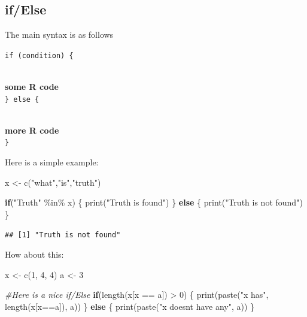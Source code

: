\documentclass[
]{book}
\newenvironment{Shaded}{\begin{snugshade}}{\end{snugshade}}
\newcommand{\CommentTok}[1]{\textcolor[rgb]{0.56,0.35,0.01}{\textit{#1}}}
\newcommand{\ControlFlowTok}[1]{\textcolor[rgb]{0.13,0.29,0.53}{\textbf{#1}}}
\newcommand{\DecValTok}[1]{\textcolor[rgb]{0.00,0.00,0.81}{#1}}
\newcommand{\FunctionTok}[1]{\textcolor[rgb]{0.00,0.00,0.00}{#1}}
\newcommand{\NormalTok}[1]{#1}
\newcommand{\OtherTok}[1]{\textcolor[rgb]{0.56,0.35,0.01}{#1}}
\newcommand{\SpecialCharTok}[1]{\textcolor[rgb]{0.00,0.00,0.00}{#1}}
\newcommand{\StringTok}[1]{\textcolor[rgb]{0.31,0.60,0.02}{#1}}
\theoremstyle{definition}
\theoremstyle{definition}
\theoremstyle{definition}
\theoremstyle{definition}
\theoremstyle{remark}
\begin{document}
\hypertarget{ifelse}{%
\subsection{if/Else}\label{ifelse}}

The main syntax is as follows

\texttt{if\ (condition)\ \{}\strut \\
\textbf{some R code}\\
\texttt{\}\ else\ \{}\strut \\
\textbf{more R code}\\
\texttt{\}}

Here is a simple example:

\begin{Shaded}
\begin{Highlighting}[]
\NormalTok{x }\OtherTok{\textless{}{-}} \FunctionTok{c}\NormalTok{(}\StringTok{"what"}\NormalTok{,}\StringTok{"is"}\NormalTok{,}\StringTok{"truth"}\NormalTok{)}

\ControlFlowTok{if}\NormalTok{(}\StringTok{"Truth"} \SpecialCharTok{\%in\%}\NormalTok{ x) \{}
   \FunctionTok{print}\NormalTok{(}\StringTok{"Truth is found"}\NormalTok{)}
\NormalTok{\} }\ControlFlowTok{else}\NormalTok{ \{}
   \FunctionTok{print}\NormalTok{(}\StringTok{"Truth is not found"}\NormalTok{)}
\NormalTok{\}}
\end{Highlighting}
\end{Shaded}

\begin{verbatim}
## [1] "Truth is not found"
\end{verbatim}

How about this:

\begin{Shaded}
\begin{Highlighting}[]
\NormalTok{x }\OtherTok{\textless{}{-}} \FunctionTok{c}\NormalTok{(}\DecValTok{1}\NormalTok{, }\DecValTok{4}\NormalTok{, }\DecValTok{4}\NormalTok{)}
\NormalTok{a }\OtherTok{\textless{}{-}} \DecValTok{3}

\CommentTok{\#Here is a nice if/Else}
\ControlFlowTok{if}\NormalTok{(}\FunctionTok{length}\NormalTok{(x[x }\SpecialCharTok{==}\NormalTok{ a]) }\SpecialCharTok{\textgreater{}} \DecValTok{0}\NormalTok{) \{}
  \FunctionTok{print}\NormalTok{(}\FunctionTok{paste}\NormalTok{(}\StringTok{"x has"}\NormalTok{, }\FunctionTok{length}\NormalTok{(x[x}\SpecialCharTok{==}\NormalTok{a]), a))}
\NormalTok{\} }\ControlFlowTok{else}\NormalTok{ \{}
  \FunctionTok{print}\NormalTok{(}\FunctionTok{paste}\NormalTok{(}\StringTok{"x doesn\textquotesingle{}t have any"}\NormalTok{, a))}
\NormalTok{\}}
\end{Highlighting}
\end{Shaded}
\end{document}
